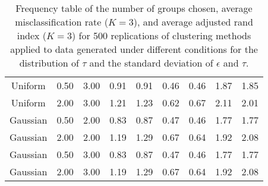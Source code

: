 \documentclass[12pt]{article}
\begin{document}
\begin{table}[ht]
\begin{center}
\begin{tabular}{ccc|cccccc}
  Uniform & 0.50 & 3.00 & 0.91 & 0.91 & 0.46 & 0.46 & 1.87 & 1.85 \\ 
  Uniform & 2.00 & 3.00 & 1.21 & 1.23 & 0.62 & 0.67 & 2.11 & 2.01 \\ 
  Gaussian & 0.50 & 2.00 & 0.83 & 0.87 & 0.47 & 0.46 & 1.77 & 1.77 \\ 
  Gaussian & 2.00 & 2.00 & 1.19 & 1.29 & 0.67 & 0.64 & 1.92 & 2.08 \\ 
  Gaussian & 0.50 & 3.00 & 0.83 & 0.87 & 0.47 & 0.46 & 1.77 & 1.77 \\ 
  Gaussian & 2.00 & 3.00 & 1.19 & 1.29 & 0.67 & 0.64 & 1.92 & 2.08 \\ 
   \hline\end{tabular}
\caption{Frequency table of the number of groups chosen, average misclassification rate ($K=3$), and average adjusted rand index ($K=3$) for 500 replications of clustering methods applied to data generated under different conditions for the distribution of $\tau$ and the standard deviation of $\epsilon$ and $\tau$.}
\label{fig:se}
\end{center}
\end{table}
\end{document}
